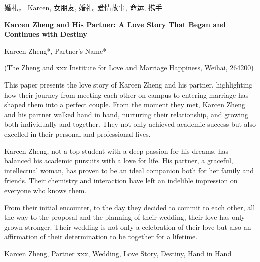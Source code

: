 \documentclass[a4paper]{article}
\begin{document}
\begin{CJK}{UTF8}{gbsn}
\vspace{2em}
 婚礼， Karcen, 女朋友, 婚礼, 爱情故事, 命运, 携手
\vspace{2em}

\begin{center}
{\Large\bf Karcen Zheng and His Partner: A Love Story That Began and Continues with Destiny}
\end{center}

\begin{center}
Karcen Zheng*, Partner's Name*
\end{center}

\begin{center}
\small (The Zheng and xxx Institute for Love and Marriage Happiness, Weihai, 264200)
\end{center}

 This paper presents the love story of Karcen Zheng and his partner, highlighting how their journey from meeting each other on campus to entering marriage has shaped them into a perfect couple. From the moment they met, Karcen Zheng and his partner walked hand in hand, nurturing their relationship, and growing both individually and together. They not only achieved academic success but also excelled in their personal and professional lives.

Karcen Zheng, not a top student with a deep passion for his dreams, has balanced his academic pursuits with a love for life. His partner, a graceful, intellectual woman, has proven to be an ideal companion both for her family and friends. Their chemistry and interaction have left an indelible impression on everyone who knows them.

From their initial encounter, to the day they decided to commit to each other, all the way to the proposal and the planning of their wedding, their love has only grown stronger. Their wedding is not only a celebration of their love but also an affirmation of their determination to be together for a lifetime.

\vspace{2em}

 Karcen Zheng, Partner xxx, Wedding, Love Story, Destiny, Hand in Hand

\end{CJK}
\end{document}
